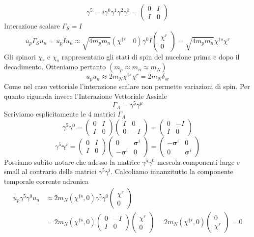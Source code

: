$$
\gamma^5 = i\gamma^0\gamma^1\gamma^2\gamma^3 = \begin{pmatrix} 0 & I \\ I & 0 \end{pmatrix}
$$
Interazione scalare $\Gamma_S=I$
$$
\overline{u}_p \Gamma_S u_n = \overline{u}_p I u_n \approx \sqrt{4m_p m_n} (\chi^{\dagger s} \quad 0) \gamma^0 I \begin{pmatrix} \chi^r \\ 0 \end{pmatrix} = \sqrt{4m_p m_n} \chi^{\dagger s} \chi^r
$$
Gli spinori $\chi_r$ e $\chi_s$ rappresentano gli stati di spin del nucelone prima e dopo il decadimento. Otteniamo pertanto $(m_p\approx m_n\approx m_N)$
$$
\overline{u}_p u_n \approx 2m_N \chi^{\dagger s} \chi^r = 2m_N \delta_{sr}
$$
Come nel caso vettoriale l'interazione scalare non permette variazioni di spin. Per quanto riguarda invece l'Interazione Vettoriale Assiale
$$
\Gamma_A = \gamma^5 \gamma^\mu
$$
Scriviamo esplicitamente le $4$ matrici $\Gamma_A$
$$
\gamma^5 \gamma^0 = \begin{pmatrix} 0 & I \\ I & 0 \end{pmatrix} \begin{pmatrix} I & 0 \\ 0 & -I \end{pmatrix} = \begin{pmatrix} 0 & -I \\ I & 0 \end{pmatrix}
$$
$$
\gamma^5 \boldsymbol{\gamma}^i = \begin{pmatrix} 0 & I \\ I & 0 \end{pmatrix} \begin{pmatrix} 0 & \boldsymbol{\sigma}^i \\ -\boldsymbol{\sigma}^i & 0 \end{pmatrix} = \begin{pmatrix} -\boldsymbol{\sigma}^i & 0 \\ 0 & \boldsymbol{\sigma}^i \end{pmatrix}
$$
Possiamo subito notare che adesso la matrice $\gamma^5\gamma^0$ mescola componenti large e small al contrario delle matrici $\gamma^5\gamma^i$. Calcoliamo innanzitutto la componente temporale corrente adronica
\begin{align*}
\overline{u}_p \gamma^5 \gamma^0 u_n &\approx 2m_N (\chi^{\dagger s}, 0) \gamma^5 \gamma^0 \begin{pmatrix} \chi^r \\ 0 \end{pmatrix} \\
&= 2m_N (\chi^{\dagger s}, 0) \begin{pmatrix} 0 & -I \\ I & 0 \end{pmatrix} \begin{pmatrix} \chi^r \\ 0 \end{pmatrix} = 2m_N (\chi^{\dagger s}, 0) \begin{pmatrix} 0 \\ \chi^r \end{pmatrix} = 0
\end{align*}
